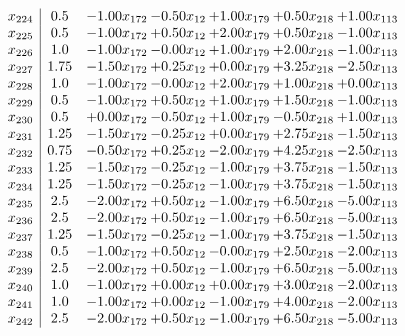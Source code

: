 \documentclass[8pt]{article}
\begin{document}
\[\begin{array}{c| c c@{\hskip 2pt} c@{\hskip 2pt} c@{\hskip 2pt} c@{\hskip 2pt} c@{\hskip 2pt} }
 x_{224}   &  0.5 & -1.00 x_{172} & -0.50 x_{12} & +  1.00 x_{179} & +  0.50 x_{218} & +  1.00 x_{113}\\
 x_{225}   &  0.5 & -1.00 x_{172} & +  0.50 x_{12} & +  2.00 x_{179} & +  0.50 x_{218} & -1.00 x_{113}\\
 x_{226}   &  1.0 & -1.00 x_{172} & -0.00 x_{12} & +  1.00 x_{179} & +  2.00 x_{218} & -1.00 x_{113}\\
 x_{227}   &  1.75 & -1.50 x_{172} & +  0.25 x_{12} & +  0.00 x_{179} & +  3.25 x_{218} & -2.50 x_{113}\\
 x_{228}   &  1.0 & -1.00 x_{172} & -0.00 x_{12} & +  2.00 x_{179} & +  1.00 x_{218} & +  0.00 x_{113}\\
 x_{229}   &  0.5 & -1.00 x_{172} & +  0.50 x_{12} & +  1.00 x_{179} & +  1.50 x_{218} & -1.00 x_{113}\\
 x_{230}   &  0.5 & +  0.00 x_{172} & -0.50 x_{12} & +  1.00 x_{179} & -0.50 x_{218} & +  1.00 x_{113}\\
 x_{231}   &  1.25 & -1.50 x_{172} & -0.25 x_{12} & +  0.00 x_{179} & +  2.75 x_{218} & -1.50 x_{113}\\
 x_{232}   &  0.75 & -0.50 x_{172} & +  0.25 x_{12} & -2.00 x_{179} & +  4.25 x_{218} & -2.50 x_{113}\\
 x_{233}   &  1.25 & -1.50 x_{172} & -0.25 x_{12} & -1.00 x_{179} & +  3.75 x_{218} & -1.50 x_{113}\\
 x_{234}   &  1.25 & -1.50 x_{172} & -0.25 x_{12} & -1.00 x_{179} & +  3.75 x_{218} & -1.50 x_{113}\\
 x_{235}   &  2.5 & -2.00 x_{172} & +  0.50 x_{12} & -1.00 x_{179} & +  6.50 x_{218} & -5.00 x_{113}\\
 x_{236}   &  2.5 & -2.00 x_{172} & +  0.50 x_{12} & -1.00 x_{179} & +  6.50 x_{218} & -5.00 x_{113}\\
 x_{237}   &  1.25 & -1.50 x_{172} & -0.25 x_{12} & -1.00 x_{179} & +  3.75 x_{218} & -1.50 x_{113}\\
 x_{238}   &  0.5 & -1.00 x_{172} & +  0.50 x_{12} & -0.00 x_{179} & +  2.50 x_{218} & -2.00 x_{113}\\
 x_{239}   &  2.5 & -2.00 x_{172} & +  0.50 x_{12} & -1.00 x_{179} & +  6.50 x_{218} & -5.00 x_{113}\\
 x_{240}   &  1.0 & -1.00 x_{172} & +  0.00 x_{12} & +  0.00 x_{179} & +  3.00 x_{218} & -2.00 x_{113}\\
 x_{241}   &  1.0 & -1.00 x_{172} & +  0.00 x_{12} & -1.00 x_{179} & +  4.00 x_{218} & -2.00 x_{113}\\
 x_{242}   &  2.5 & -2.00 x_{172} & +  0.50 x_{12} & -1.00 x_{179} & +  6.50 x_{218} & -5.00 x_{113}\\

\end{array}\]
\end{document}
